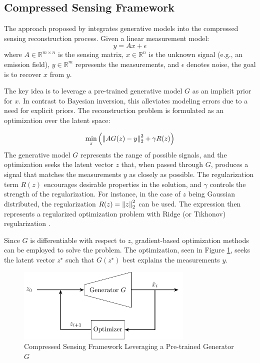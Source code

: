 \subsection{Compressed Sensing Framework}

The approach proposed by \textcite{CSUsingAI} integrates generative models into the compressed sensing reconstruction process.
Given a linear measurement model:
\begin{equation}
 y = A x + \epsilon
\end{equation}
where $A \in \mathbb{R}^{m \times n}$ is the sensing matrix, $x \in \mathbb{R}^n$ is the unknown signal (e.g., an emission field), $y \in \mathbb{R}^m$ represents the measurements, and $\epsilon$ denotes noise, the goal is to recover $x$ from $y$.

The key idea is to leverage a pre-trained generative model $G$ as an implicit prior for $x$.
In contrast to Bayesian inversion, this alleviates modeling errors due to a need for explicit priors.
The reconstruction problem is formulated as an optimization over the latent space:

\begin{equation}
 \min_{z}{\left( \left\lVert A G(z) - y\right\rVert_2^2 + \gamma R(z) \right)}
\end{equation}
The generative model $G$ represents the range of possible signals, and the optimization seeks the latent vector $z$ that, when passed through $G$, produces a signal that matches the measurements $y$ as closely as possible.
The regularization term $R(z)$ encourages desirable properties in the solution, and $\gamma$ controls the strength of the regularization.
For instance, in the case of $z$ being Gaussian distributed, the regularization $R(z) = \left\lVert z\right\rVert_2^2$ can be used.
The expression then represents a regularized optimization problem with Ridge (or Tikhonov) regularization \parencite{Ridge}.

Since $G$ is differentiable with respect to $z$, gradient-based optimization methods can be employed to solve the problem.
The optimization, seen in Figure \ref{fig:gen_solver}, seeks the latent vector $z^{\star}$ such that $G(z^{\star})$ best explains the measurements $y$.

\begin{figure}[htb]
    \centering
    \includegraphics[width=0.75\textwidth]{figures/02_related_work/latent_variable_optimization/build/latent_variable_optimization.pdf}
    \caption{Compressed Sensing Framework Leveraging a Pre-trained Generator $G$ \parencite{CSUsingAI}}
    \label{fig:gen_solver}
\end{figure}

